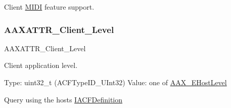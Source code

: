 Client \mbox{\hyperlink{a00806}{M\+I\+DI}} feature support. 

\mbox{\label{a00683_a1bbc82d62cf23079e92826874381a891}} 
\subsubsection{\texorpdfstring{AAXATTR\_Client\_Level}{AAXATTR\_Client\_Level}}
{\footnotesize\ttfamily A\+A\+X\+A\+T\+T\+R\+\_\+\+Client\+\_\+\+Level}



Client application level. 

Type\+: {\ttfamily uint32\+\_\+t} ({\ttfamily A\+C\+F\+Type\+I\+D\+\_\+\+U\+Int32}) Value\+: one of \mbox{\hyperlink{a00491_a2d34e7a7c2e6f4f6361555ad02869219}{A\+A\+X\+\_\+\+E\+Host\+Level}}

Query using the host\textquotesingle{}s \mbox{\hyperlink{a01413}{I\+A\+C\+F\+Definition}} 